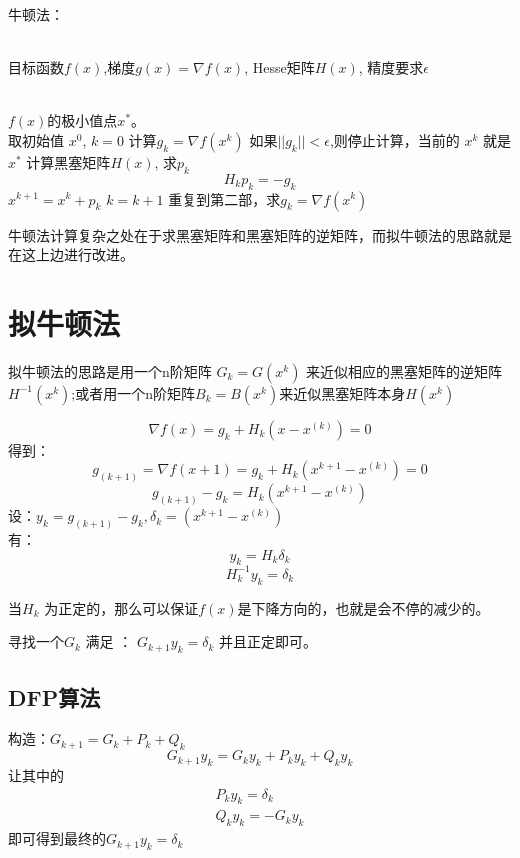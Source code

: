 \documentclass[UTF8]{ctexart}
\begin{document}
\begin{algorithm}[htb] 
	    	\caption{ 牛顿法：} 
	    	\label{alg:Framwork} 
	    	\begin{algorithmic}[1] %
	    		\REQUIRE ~~\\ %
	    		目标函数$f(x)$,梯度$g(x)=\nabla f(x)$, Hesse矩阵$H(x)$, 精度要求$\epsilon$
	    		
	    		\ENSURE ~~\\ %
				$f(x)$的极小值点$x^*$。\\
				\STATE 取初始值 $x^0$, $k=0$
				\STATE 计算$g_{k} = \nabla f(x^{k})$
				\STATE 如果$||g_{k}|| < \epsilon $,则停止计算，当前的 $x^{k}$ 就是 $x^{*}$
				\STATE 计算黑塞矩阵$H(x)$, 求$ p_{k}$
				$$
				H_{k} p_{k}=-g_{k}
				$$
				\STATE $x^{k+1} = x^{k} +  p_{k}$
				\STATE $k = k+1$ 重复到第二部，求$g_{k} = \nabla f(x^{k})$
				
	
	    	\end{algorithmic}
  \end{algorithm}

牛顿法计算复杂之处在于求黑塞矩阵和黑塞矩阵的逆矩阵，而拟牛顿法的思路就是在这上边进行改进。

\section{拟牛顿法}
拟牛顿法的思路是用一个n阶矩阵 $G_k = G(x^k)$ 来近似相应的黑塞矩阵的逆矩阵$H^{-1}(x^{k})$;或者用一个n阶矩阵$B_k = B(x^k)$来近似黑塞矩阵本身$H(x^{k})$

$$
\nabla f(x)=g_{k}+H_{k}\left(x-x^{(k)}\right) = 0
$$
得到：
$$
g_{(k+1)} = \nabla f(x+1)=g_{k}+H_{k}\left(x^{k+1}-x^{(k)}\right) = 0
$$
$$
g_{(k+1)}-g_{k} = H_{k}\left(x^{k+1}-x^{(k)}\right)
$$
设：$y_k = g_{(k+1)}-g_{k}, \delta_k = \left(x^{k+1}-x^{(k)}\right)$\\
有：
$$
y_k = H_{k}\delta_k
$$
$$H_{k}^{-1} y_{k}=\delta_{k}$$

当$H_{k}$ 为正定的，那么可以保证$f(x)$是下降方向的，也就是会不停的减少的。

寻找一个$G_k$ 满足 ： 
$G_{k+1} y_{k}=\delta_{k}$ 并且正定即可。

\subsection{DFP算法}
构造：$G_{k+1}=G_{k}+P_{k}+Q_{k}$\\
$$G_{k+1} y_{k}=G_{k} y_{k}+P_{k} y_{k}+Q_{k} y_{k}$$
让其中的
$$\begin{array}{c}
P_{k} y_{k}=\delta_{k} \\
Q_{k} y_{k}=-G_{k} y_{k}
\end{array}$$ 即可得到最终的$G_{k+1} y_{k}=\delta_{k}$
\end{document}
